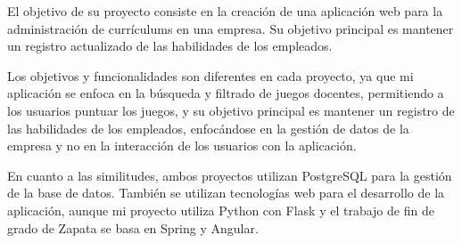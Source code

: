 El objetivo de su proyecto consiste en la creación de una aplicación web para la administración de currículums en una empresa. Su objetivo principal es mantener un registro actualizado de las habilidades de los empleados.

Los objetivos y funcionalidades son diferentes en cada proyecto, ya que mi aplicación se enfoca en la búsqueda y filtrado de juegos docentes, permitiendo a los usuarios puntuar los juegos, y su objetivo principal es mantener un registro de las habilidades de los empleados, enfocándose en la gestión de datos de la empresa y no en la interacción de los usuarios con la aplicación.

En cuanto a las similitudes, ambos proyectos utilizan PostgreSQL para la gestión de la base de datos. También se utilizan tecnologías web para el desarrollo de la aplicación, aunque mi proyecto utiliza Python con Flask y el trabajo de fin de grado de Zapata se basa en Spring y Angular.
